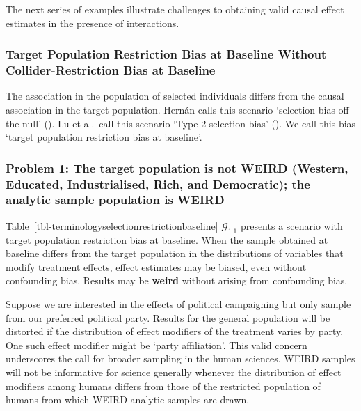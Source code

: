 \documentclass[
  single column]{article}
\begin{document}
The next series of examples illustrate challenges to obtaining valid
causal effect estimates in the presence of interactions.

\subsubsection{Target Population Restriction Bias at Baseline Without
Collider-Restriction Bias at
Baseline}\label{target-population-restriction-bias-at-baseline-without-collider-restriction-bias-at-baseline}

\begin{table}

\caption{\label{tbl-terminologyselectionrestrictionbaseline}The
association in the population of selected individuals differs from the
causal association in the target population. Hernán calls this scenario
`selection bias off the null' (). Lu et al.~call this scenario `Type 2 selection bias'
(). We call this bias
`target population restriction bias at baseline'.}

\centering{

\terminologyselectionrestrictionbaseline

}

\end{table}%

\subsubsection{Problem 1: The target population is not WEIRD (Western,
Educated, Industrialised, Rich, and Democratic); the analytic sample
population is
WEIRD}\label{problem-1-the-target-population-is-not-weird-western-educated-industrialised-rich-and-democratic-the-analytic-sample-population-is-weird}

Table~\ref{tbl-terminologyselectionrestrictionbaseline}
\(\mathcal{G}_{1.1}\) presents a scenario with target population
restriction bias at baseline. When the sample obtained at baseline
differs from the target population in the distributions of variables
that modify treatment effects, effect estimates may be biased, even
without confounding bias. Results may be \textbf{weird} without arising
from confounding bias.

Suppose we are interested in the effects of political campaigning but
only sample from our preferred political party. Results for the general
population will be distorted if the distribution of effect modifiers of
the treatment varies by party. One such effect modifier might be `party
affiliation'. This valid concern underscores the call for broader
sampling in the human sciences. WEIRD samples will not be informative
for science generally whenever the distribution of effect modifiers
among humans differs from those of the restricted population of humans
from which WEIRD analytic samples are drawn.
\end{document}
